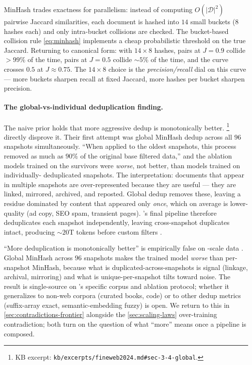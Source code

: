 \begin{intuition}
\label{intuit:minhash}
MinHash trades exactness for parallelism: instead of computing
$O(|\mathcal{D}|^2)$ pairwise Jaccard similarities, each document is
hashed into $14$ small buckets (8 hashes each) and only intra-bucket
collisions are checked. The bucket-based collision rule
\cref{eq:minhash} implements a cheap probabilistic threshold on the
true Jaccard. Returning to canonical form: with $14 \times 8$
hashes, pairs at $J = 0.9$ collide $> 99\%$ of the time, pairs at
$J = 0.5$ collide $\sim 5\%$ of the time, and the curve crosses $0.5$
at $J \approx 0.75$. The $14 \times 8$ choice is the
\emph{precision/recall} dial on this curve --- more buckets sharpen
recall at fixed Jaccard, more hashes per bucket sharpen precision.
\end{intuition}

\paragraph{The global-vs-individual deduplication finding.}
The naive prior holds that more aggressive dedup is monotonically
better. \citet[\S 3.4]{fineweb2024}\footnote{KB excerpt:
\texttt{kb/excerpts/fineweb2024.md\#sec-3-4-global}.} directly
disprove it. Their first attempt was global MinHash dedup across all
$96$ snapshots simultaneously. ``When applied to the oldest
snapshots, this process removed as much as $90\%$ of the original
base filtered data,'' and the ablation models trained on the survivors
were \emph{worse}, not better, than models trained on individually-
deduplicated snapshots. The interpretation: documents that appear in
multiple snapshots are over-represented because they are useful ---
they are linked, mirrored, archived, and reposted. Global dedup
removes these, leaving a residue dominated by content that appeared
only \emph{once}, which on average is lower-quality (ad copy, SEO
spam, transient pages). 's final pipeline therefore
deduplicates each snapshot independently, leaving cross-snapshot
duplicates intact, producing $\sim 20$T tokens before custom filters
\citep[\S 3.4]{fineweb2024}.

\begin{contradiction}
\label{contra:global-vs-indiv-dedup}
``More deduplication is monotonically better'' is empirically false
on -scale data \citep[\S 3.4]{fineweb2024}. Global MinHash
across $96$  snapshots makes the trained model
\emph{worse} than per-snapshot MinHash, because what is
duplicated-across-snapshots is signal (linkage, archival, mirroring)
and what is unique-per-snapshot tilts toward noise. The result is
single-source on 's specific corpus and ablation protocol;
whether it generalizes to non-web corpora (curated books, code) or
to other dedup metrics (suffix-array exact, semantic-embedding
fuzzy) is open. We return to this in
\cref{sec:contradictions-frontier} alongside the
\cref{sec:scaling-laws} over-training contradiction; both turn on
the question of what ``more'' means once a pipeline is composed.
\end{contradiction}

